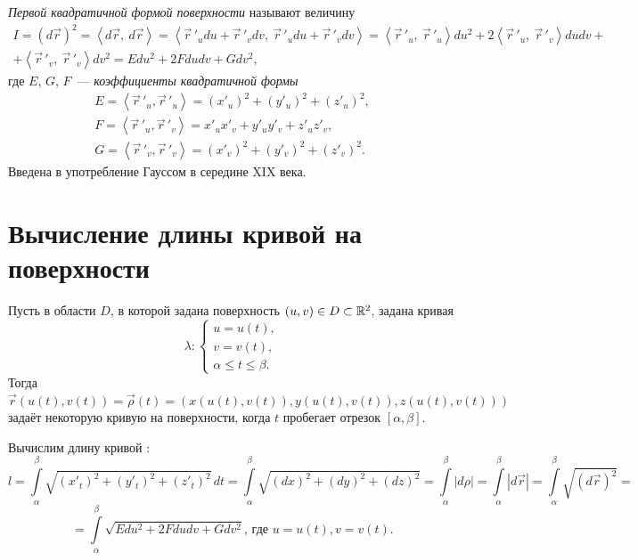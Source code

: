 \documentclass[../../main.tex]{subfiles}
\begin{document}
 \emph{Первой квадратичной формой поверхности} называют величину 
 \begin{gather*}
 I = (d\vec{r})^2 = \left<d\vec{r}, \ d\vec{r}
 \right> = \left<\vec r\,'_udu + \vec r\,'_vdv, \ 
 \vec r\,'_udu + \vec r\,'_vdv\right> = \left<\vec 
 r\,'_u, \ \vec r\,'_u\right>du^2 + 
 2\left<\vec r\,'_u, \ \vec r\,'_v\right>dudv + \\ 
 + \left<\vec r\,'_v, \ \vec r\,'_v\right>dv^2 = 
 Edu^2 + 2Fdudv + Gdv^2,
 \end{gather*}
 где $E$, $G$, $F$~--- \emph{коэффициенты квадратичной формы}
\begin{gather*}
E = \left<\vec r\,'_u, \vec r\,'_u\right> = (x'_u)^2 + (y'_u)^2 + (z'_u)^2, \\
F = \left<\vec r\,'_u, \vec r\,'_v\right> = x'_ux'_v + y'_uy'_v + z'_uz'_v, \\
G = \left<\vec r\,'_v, \vec r\,'_v\right> = (x'_v)^2 + (y'_v)^2 + (z'_v)^2.
\end{gather*}
Введена в употребление Гауссом в середине XIX века.

\section{Вычисление длины кривой на поверхности}

Пусть в области $D$, в которой задана поверхность 
$(u, v) \in D \subset \mathbb{R}^2$, задана кривая 
\[\lambda : \begin{cases}
             u = u(t),\\
             v = v(t),\\
             \alpha \leq t \leq \beta.
            \end{cases}\]
Тогда $\vec{r}(u(t), v(t)) = \vec{\rho}(t) = (x(u(t), v(t)), y(u(t), 
v(t)), z(u(t), v(t)))$ задаёт некоторую кривую на поверхности, когда $t$ 
пробегает отрезок $\left[\alpha, \beta\right]$.

Вычислим длину кривой : 
\[
l = \int\limits_\alpha^\beta\sqrt{(x'_t)^2 + (y'_t)^2 + (z'_t)^2}\,dt = 
\int\limits_\alpha^\beta\sqrt{(dx)^2 + (dy)^2 + (dz)^2} = 
\int\limits_\alpha^\beta  |d\rho| =  \int\limits_\alpha^\beta|d\vec{r}| = 
\int\limits_\alpha^\beta\sqrt{(d\vec{r})^2} = \] 
\[ 
= \int\limits_\alpha^\beta\sqrt{Edu^2 + 2Fdudv + Gdv^2} \text{, где } u = 
u(t), v = v(t). 
\]
\end{document}
